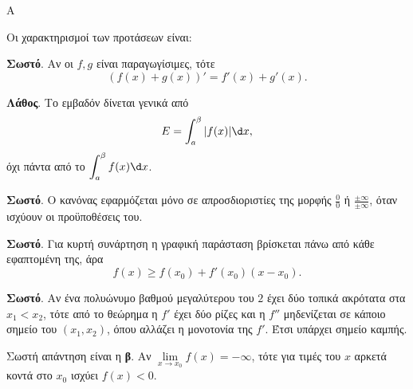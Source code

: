 \begin{thema}{Α}
\begin{erwthma}
\item {}

\item {}

\item {}

\item Οι χαρακτηρισμοί των προτάσεων είναι:
\begin{alist}
\item \textbf{Σωστό}. Αν οι $f,g$ είναι παραγωγίσιμες, τότε
\[ (f(x)+g(x))'=f'(x)+g'(x). \]
\item \textbf{Λάθος}. Το εμβαδόν δίνεται γενικά από
\[ E=\dint_a^\beta |f(x)|\d x, \]
όχι πάντα από το $\dint_a^\beta f(x)\d x$.
\item \textbf{Σωστό}. Ο κανόνας  εφαρμόζεται μόνο σε απροσδιοριστίες της μορφής $\frac{0}{0}$ ή $\frac{\pm\infty}{\pm\infty}$, όταν ισχύουν οι προϋποθέσεις του.
\item \textbf{Σωστό}. Για κυρτή συνάρτηση η γραφική παράσταση βρίσκεται πάνω από κάθε εφαπτομένη της, άρα
\[ f(x)\ge f(x_0)+f'(x_0)(x-x_0). \]
\item \textbf{Σωστό}. Αν ένα πολυώνυμο βαθμού μεγαλύτερου του $2$ έχει δύο τοπικά ακρότατα στα $x_1<x_2$, τότε από το θεώρημα  η $f'$ έχει δύο ρίζες και η $f''$ μηδενίζεται σε κάποιο σημείο του $(x_1,x_2)$, όπου αλλάζει η μονοτονία της $f'$. Έτσι υπάρχει σημείο καμπής.
\end{alist}

\item Σωστή απάντηση είναι η \textbf{β}. Αν $\lim\limits_{x\to x_0}f(x)=-\infty$, τότε για τιμές του $x$ αρκετά κοντά στο $x_0$ ισχύει $f(x)<0$.
\end{erwthma}
\end{thema}

